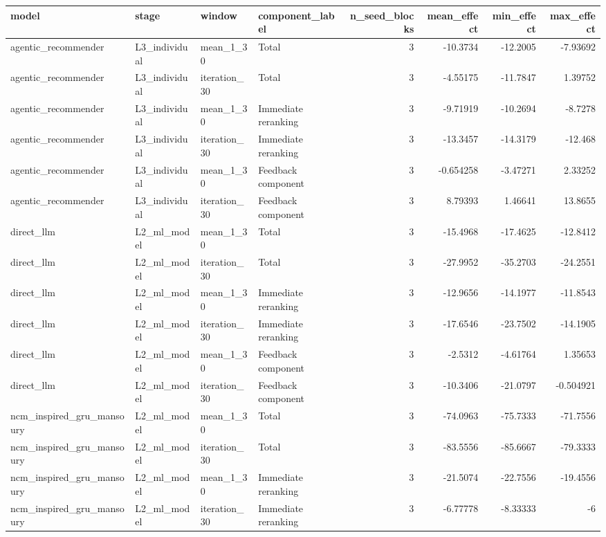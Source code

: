 \begin{table}[htbp!]
\centering
\small
\setlength{\tabcolsep}{3pt}
\renewcommand{\arraystretch}{1.1}
\begin{tabular}{llllrrrr}
\hline
model & stage & window & component\_label & n\_seed\_blocks & mean\_effect & min\_effect & max\_effect \\
\hline
agentic\_recommender & L3\_individual & mean\_1\_30 & Total & 3 & -10.3734 & -12.2005 & -7.93692 \\
agentic\_recommender & L3\_individual & iteration\_30 & Total & 3 & -4.55175 & -11.7847 & 1.39752 \\
agentic\_recommender & L3\_individual & mean\_1\_30 & Immediate reranking & 3 & -9.71919 & -10.2694 & -8.7278 \\
agentic\_recommender & L3\_individual & iteration\_30 & Immediate reranking & 3 & -13.3457 & -14.3179 & -12.468 \\
agentic\_recommender & L3\_individual & mean\_1\_30 & Feedback component & 3 & -0.654258 & -3.47271 & 2.33252 \\
agentic\_recommender & L3\_individual & iteration\_30 & Feedback component & 3 & 8.79393 & 1.46641 & 13.8655 \\
direct\_llm & L2\_ml\_model & mean\_1\_30 & Total & 3 & -15.4968 & -17.4625 & -12.8412 \\
direct\_llm & L2\_ml\_model & iteration\_30 & Total & 3 & -27.9952 & -35.2703 & -24.2551 \\
direct\_llm & L2\_ml\_model & mean\_1\_30 & Immediate reranking & 3 & -12.9656 & -14.1977 & -11.8543 \\
direct\_llm & L2\_ml\_model & iteration\_30 & Immediate reranking & 3 & -17.6546 & -23.7502 & -14.1905 \\
direct\_llm & L2\_ml\_model & mean\_1\_30 & Feedback component & 3 & -2.5312 & -4.61764 & 1.35653 \\
direct\_llm & L2\_ml\_model & iteration\_30 & Feedback component & 3 & -10.3406 & -21.0797 & -0.504921 \\
ncm\_inspired\_gru\_mansoury & L2\_ml\_model & mean\_1\_30 & Total & 3 & -74.0963 & -75.7333 & -71.7556 \\
ncm\_inspired\_gru\_mansoury & L2\_ml\_model & iteration\_30 & Total & 3 & -83.5556 & -85.6667 & -79.3333 \\
ncm\_inspired\_gru\_mansoury & L2\_ml\_model & mean\_1\_30 & Immediate reranking & 3 & -21.5074 & -22.7556 & -19.4556 \\
ncm\_inspired\_gru\_mansoury & L2\_ml\_model & iteration\_30 & Immediate reranking & 3 & -6.77778 & -8.33333 & -6 \\

\end{tabular}
\end{table}
